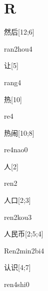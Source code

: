 ﻿%
\section*{R}

\begin{verbete}{然后}[12;6]
\begin{pronuncia}{ran2hou4}
\end{pronuncia}
\end{verbete}

\begin{verbete}[rang4]{让}[5]
\begin{pronuncia}{rang4}
\end{pronuncia}
\end{verbete}

\begin{verbete}[re4]{热}[10]
\begin{pronuncia}{re4}
\end{pronuncia}
\end{verbete}

\begin{verbete}[re4nao0]{热闹}[10;8]
\begin{pronuncia}{re4nao0}
\end{pronuncia}
\end{verbete}

\begin{verbete}[ren2]{人}[2]
\begin{pronuncia}{ren2}
\end{pronuncia}
\end{verbete}

\begin{verbete}{人口}[2;3]
\begin{pronuncia}{ren2kou3}
\end{pronuncia}
\end{verbete}

\begin{verbete}{人民币}[2;5;4]
\begin{pronuncia}{Ren2min2bi4}
\end{pronuncia}
\end{verbete}

\begin{verbete}{认识}[4;7]
\begin{pronuncia}{ren4shi0}
\end{pronuncia}
\end{verbete}

